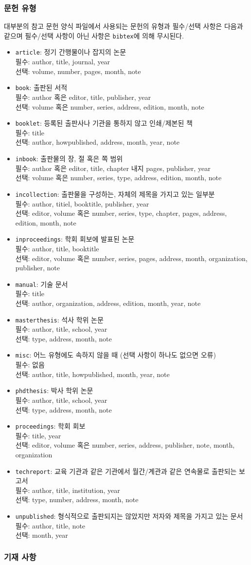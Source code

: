 \subsubsection{문헌 유형}
\label{sec:typedoc}

대부분의 참고 문헌 양식 파일에서 사용되는 문헌의 유형과 필수/선택
사항은 다음과 같으며 필수/선택 사항이 아닌 사항은 \texttt{bibtex}에
의해 무시된다.

\newcommand{\bibtype}[4]{\item \texttt{#1}: #2\\필수: #3\\선택: #4}
\begin{itemize}
\bibtype{article}
{정기 간행물이나 잡지의 논문}
{author, title, journal, year}
{volume, number, pages, month, note}
\bibtype{book}
{출판된 서적}
{author 혹은 editor, title, publisher, year}
{volume 혹은 number, series, address, edition, month, note}
\bibtype{booklet}
{등록된 출판사나 기관을 통하지 않고 인쇄/제본된 책}
{title}
{author, howpublished, address, month, year, note}
\bibtype{inbook}
{출판물의 장, 절 혹은 쪽 범위}
{author 혹은 editor, title, chapter 내지 pages, publisher, year}
{volume 혹은 number, series, type, address, edition, month, note}
\bibtype{incollection}
{출판물을 구성하는, 자체의 제목을 가지고 있는 일부분}
{author, titiel, booktitle, publisher, year}
{editor, volume 혹은 number, series, type, chapter, pages, address,
  edition, month, note}
\bibtype{inproceedings}
{학회 회보에 발표된 논문}
{author, title, booktitle}
{editor, volume 혹은 number, series, pages, address, month,
  organization, publisher, note}
\bibtype{manual}
{기술 문서}
{title}
{author, organization, address, edition, month, year, note}
\bibtype{masterthesis}
{석사 학위 논문}
{author, title, school, year}
{type, address, month, note}
\bibtype{misc}
{어느 유형에도 속하지 않을 때 (선택 사항이 하나도 없으면 오류)}
{없음}
{author, title, howpublished, month, year, note}
\bibtype{phdthesis}
{박사 학위 논문}
{author, title, school, year}
{type, address, month, note}
\bibtype{proceedings}
{학회 회보}
{title, year}
{editor, volume 혹은 number, series, address, publisher, note, month,
  organization}
\bibtype{techreport}
{교육 기관과 같은 기관에서 월간/계관과 같은 연속물로 출판되는 보고서}
{author, title, institution, year}
{type, number, address, month, note}
\bibtype{unpublished}
{형식적으로 출판되지는 않았지만 저자와 제목을 가지고 있는 문서}
{author, title, note}
{month, year}
\end{itemize}


\subsubsection{기재 사항}
\label{sec:annotation}

